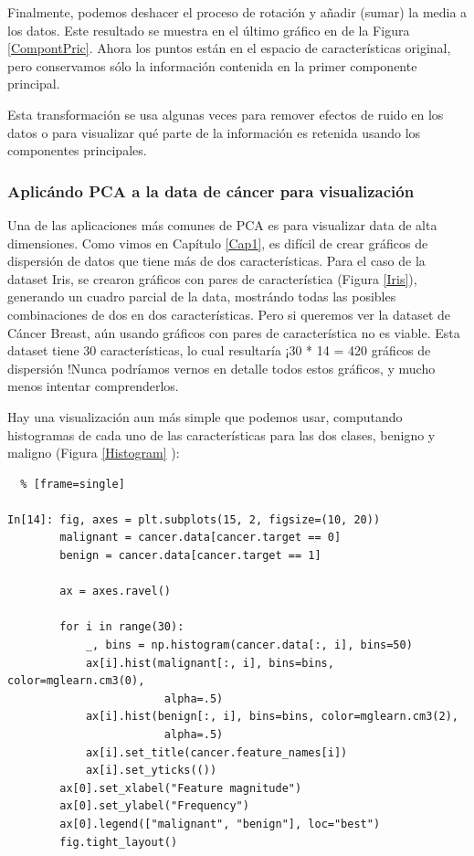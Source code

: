 Finalmente, podemos deshacer el proceso de rotación y añadir (sumar)  la media  a los datos.
Este resultado se muestra en el último gráfico  en de la Figura \ref{CompontPric}. Ahora los puntos están 
 en el espacio de características original, pero conservamos  sólo la información contenida en la primer componente principal.
 
Esta transformación se usa algunas veces para remover efectos de ruido en los datos o para 
visualizar qué parte de la información es retenida usando los componentes principales.


\subsubsection{Aplicándo PCA a la  data de cáncer para visualización}


Una de las aplicaciones más comunes de PCA es para visualizar data de alta dimensiones. Como vimos en Capítulo \ref{Cap1}, es difícil de crear gráficos  de dispersión de datos que tiene más de dos características.  Para  el caso de la dataset Iris, se crearon   gráficos con  pares de característica (Figura \ref{Iris}),    generando un cuadro parcial de la data, mostrándo todas las posibles combinaciones de dos en dos características.   Pero si queremos ver la dataset de Cáncer Breast, aún usando  gráficos con  pares de característica no es viable. Esta dataset tiene 30 características, lo cual resultaría  ¡30 * 14 = 420 gráficos  de dispersión   !Nunca podríamos vernos en detalle todos estos gráficos, y mucho menos  intentar comprenderlos.



Hay una visualización aun más simple que podemos usar,  computando histogramas de
cada uno de las características para las dos clases, benigno y maligno (Figura \ref{Histogram} ):\\

\begin{lstlisting}  % [frame=single]	

In[14]: fig, axes = plt.subplots(15, 2, figsize=(10, 20))
        malignant = cancer.data[cancer.target == 0]
        benign = cancer.data[cancer.target == 1]
   
        ax = axes.ravel() 

        for i in range(30):
            _, bins = np.histogram(cancer.data[:, i], bins=50)
            ax[i].hist(malignant[:, i], bins=bins, color=mglearn.cm3(0), 
                        alpha=.5)
            ax[i].hist(benign[:, i], bins=bins, color=mglearn.cm3(2), 
                        alpha=.5)
            ax[i].set_title(cancer.feature_names[i])
            ax[i].set_yticks(())
        ax[0].set_xlabel("Feature magnitude")
        ax[0].set_ylabel("Frequency")
        ax[0].legend(["malignant", "benign"], loc="best")
        fig.tight_layout()


\end{lstlisting} 



